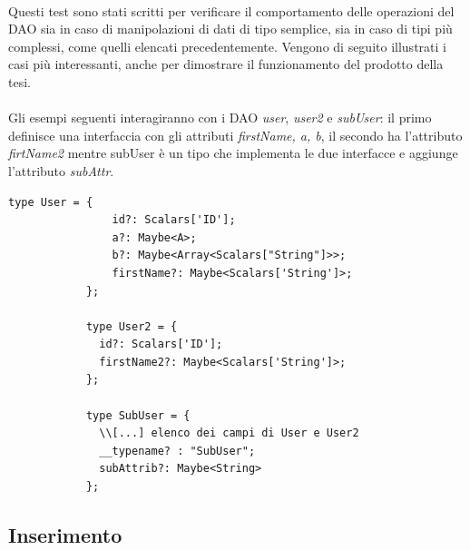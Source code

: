 \documentclass[a4paper, 12pt]{report}
\begin{document}
        \paragraph*{}
          Questi test sono stati scritti per verificare il comportamento delle operazioni del DAO sia in caso di manipolazioni di dati di tipo semplice, sia in caso di tipi più complessi, come quelli elencati precedentemente.
          Vengono di seguito illustrati i casi più interessanti, anche per dimostrare il funzionamento del prodotto della tesi.
          \paragraph*{}
          Gli esempi seguenti interagiranno con i DAO \emph{user}, \emph{user2} e \emph{subUser}: il primo definisce una interfaccia con gli attributi \emph{firstName, a, b}, il secondo ha l'attributo \emph{firtName2} mentre subUser è un tipo che implementa le due interfacce e aggiunge l'attributo \emph{subAttr}.
          \begin{Verbatim}[samepage=true]
            type User = {
                id?: Scalars['ID'];
                a?: Maybe<A>;
                b?: Maybe<Array<Scalars["String"]>>;
                firstName?: Maybe<Scalars['String']>;
            };
            
            type User2 = {
              id?: Scalars['ID'];
              firstName2?: Maybe<Scalars['String']>;
            };
            
            type SubUser = {
              \\[...] elenco dei campi di User e User2
              __typename? : "SubUser";
              subAttrib?: Maybe<String>
            };

          \end{Verbatim}
        \newpage
        \subsection{Inserimento}
\end{document}
